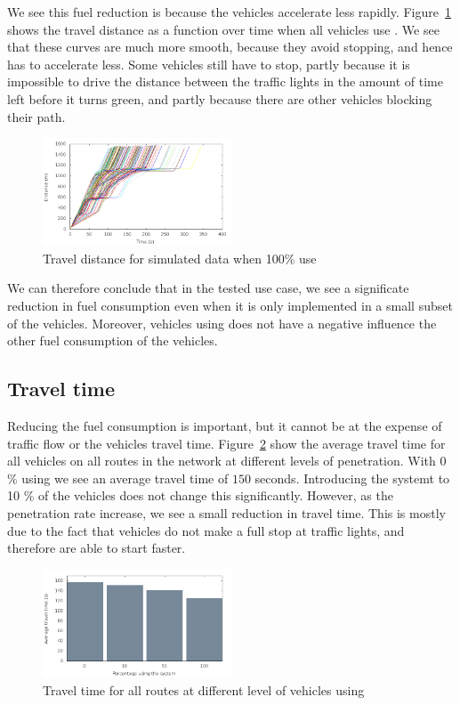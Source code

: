 We see this fuel reduction is because the vehicles accelerate less rapidly. 
Figure~\ref{fig:TestResults:distance100} shows the travel distance as a function over time when all vehicles use \tech. 
We see that these curves are much more smooth, because they avoid stopping, and hence has to accelerate less.
Some vehicles still have to stop, partly because it is impossible to drive the distance between the traffic lights in the amount of time left before it turns green, and partly because there are other vehicles blocking their path.
\begin{figure}[htb]
\includegraphics[width=0.5\textwidth]{../images/tp0c1_0/distanceControlled100.png}
\caption{Travel distance for simulated data when 100\% use \tech}
\label{fig:TestResults:distance100}
\end{figure}

We can therefore conclude that in the tested use case, we see a significate reduction in fuel consumption even when it is only implemented in a small subset of the vehicles. 
Moreover, vehicles using \tech does not have a negative influence the other fuel consumption of the vehicles.

\subsection{Travel time}
Reducing the fuel consumption is important, but it cannot be at the expense of traffic flow or the vehicles travel time.
Figure~\ref{fig:TestResults:combinedTime} show the average travel time for all vehicles on all routes in the network at different levels of penetration.
With 0 \% using \tech we see an average travel time of $150$ seconds. 
Introducing the systemt to 10 \% of the vehicles does not change this significantly. 
However, as the penetration rate increase, we see a small reduction in travel time. 
This is mostly due to the fact that vehicles do not make a full stop at traffic lights, and therefore are able to start faster.

\begin{figure}[h]
\includegraphics[width=0.5\textwidth]{../images/tp0c1_0/combinedTime.png}
\caption{Travel time for all routes at different level of vehicles using \tech}
\label{fig:TestResults:combinedTime}
\end{figure}

